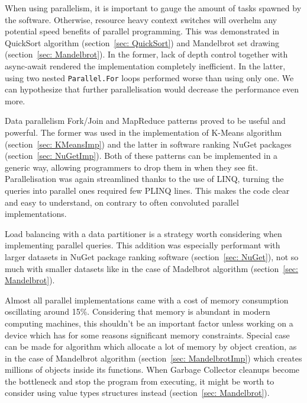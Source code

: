 When using parallelism, it is important to gauge the amount of tasks spawned by the software. Otherwise, resource heavy context switches will overhelm any potential speed benefits of parallel programming. This was demonstrated in QuickSort algorithm (section~\ref{sec: QuickSort}) and Mandelbrot set drawing (section~\ref{sec: Mandelbrot}). In the former, lack of depth control together with async-await rendered the implementation completely inefficient. In the latter, using two nested \texttt{Parallel.For} loops performed worse than using only one. We can hypothesize that further parallelisation would decrease the performance even more. 

Data parallelism Fork/Join and MapReduce patterns proved to be useful and powerful. The former was used in the implementation of K-Means algorithm (section~\ref{sec: KMeansImp}) and the latter in software ranking NuGet packages (section~\ref{sec: NuGetImp}). Both of these patterns can be implemented in a generic way, allowing programmers to drop them in when they see fit. Parallelisation was again streamlined thanks to the use of LINQ, turning the queries into parallel ones required few PLINQ lines. This makes the code clear and easy to understand, on contrary to often convoluted parallel implementations. 

Load balancing with a data partitioner is a strategy worth considering when implementing parallel queries. This addition was especially performant with larger datasets in NuGet package ranking software (section~\ref{sec: NuGet}), not so much with smaller datasets like in the case of Madelbrot algorithm (section~\ref{sec: Mandelbrot}). 

Almost all parallel implementations came with a cost of memory consumption oscillating around 15\%. Considering that memory is abundant in modern computing machines, this shouldn't be an important factor unless working on a device which has for some reasons significant memory constraints. Special case can be made for algorithm which allocate a lot of memory by object creation, as in the case of Mandelbrot algorithm (section~\ref{sec: MandelbrotImp}) which creates millions of objects inside its functions. When Garbage Collector cleanups become the bottleneck and stop the program from executing, it might be worth to consider using value types structures instead (section~\ref{sec: Mandelbrot}).\\

